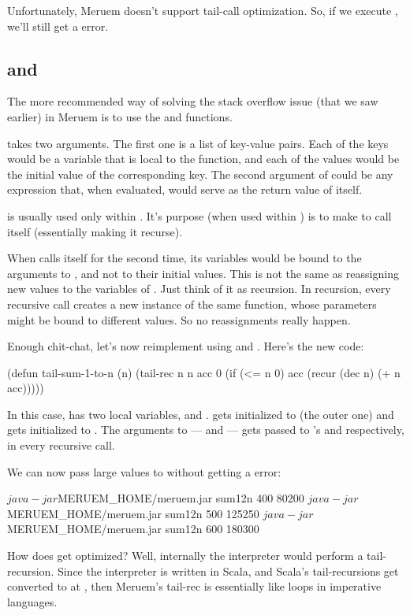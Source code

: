 Unfortunately, Meruem doesn't support tail-call optimization. So, if we execute , we'll still get a  error.

\subsection{ and }
The more recommended way of solving the stack overflow issue (that we saw earlier) in Meruem is to use the  and  functions. 

 takes two arguments. The first one is a list of key-value pairs. Each of the keys would be a variable that is local to the  function, and each of the values would be the initial value of the corresponding key. The second argument of  could be any expression that, when evaluated, would serve as the return value of  itself.

 is usually used only within . It's purpose (when used within ) is to make  to call itself (essentially making it recurse). 

When  calls itself for the second time, its variables would be bound to the arguments to , and not to their initial values. This is not the same as reassigning new values to the variables of . Just think of it as recursion. In recursion, every recursive call creates a new instance of the same function, whose parameters might be bound to different values. So no reassignments really happen.

Enough chit-chat, let's now reimplement  using  and . Here's the new code:

\begin{Meruem}
(defun tail-sum-1-to-n (n)
  (tail-rec { n n acc 0 }
    (if (<= n 0)
      acc
      (recur (dec n) (+ n acc)))))
\end{Meruem}

In this case,  has two local variables,  and .  gets initialized to  (the outer one) and  gets initialized to . The arguments to  ---  and  --- gets passed to 's  and  respectively, in every recursive call.

We can now pass large values to  without getting a  error:

\begin{REPL}
$ java -jar $MERUEM_HOME/meruem.jar sum12n 400
80200
$ java -jar $MERUEM_HOME/meruem.jar sum12n 500
125250
$ java -jar $MERUEM_HOME/meruem.jar sum12n 600
180300
\end{REPL}

How does  get optimized? Well, internally the interpreter would perform a tail-recursion. Since the interpreter is written in Scala, and Scala's tail-recursions get converted to  at , then Meruem's tail-rec is essentially like loops in imperative languages.